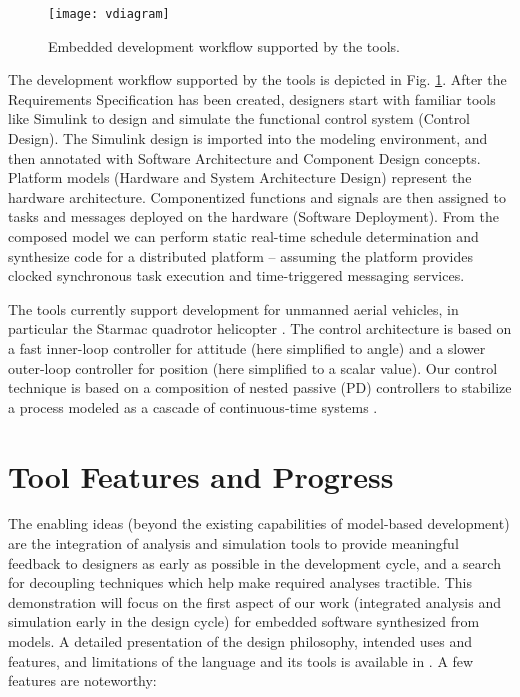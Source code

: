 \begin{figure}[!b]
\centering
\texttt{[image: vdiagram]}
\caption{Embedded development workflow supported by the tools.}
\label{fig:vdiagram}
\end{figure}

The development workflow supported by the tools is depicted in 
Fig. \ref{fig:vdiagram}.  After the Requirements Specification 
has been created, designers start with familiar tools like Simulink to
design and simulate the functional control system (Control Design).  
The Simulink design is imported into the modeling 
environment, and then annotated with Software Architecture and Component 
Design concepts.  Platform models (Hardware and System Architecture 
Design) represent the hardware architecture.  Componentized functions 
and signals are then assigned to tasks and messages deployed on the 
hardware (Software Deployment). From the composed model we can perform 
static real-time schedule determination and synthesize code for a distributed 
platform -- assuming the platform provides clocked synchronous task execution 
and time-triggered messaging services.  

The tools currently support development for unmanned aerial vehicles,
in particular the Starmac quadrotor helicopter \cite{HRWDJT04}.  The control
architecture is based on a fast inner-loop controller for attitude (here simplified
to angle) and a slower outer-loop controller for position (here simplified to a
scalar value).  Our control technique is based on a composition of nested passive 
(PD) controllers to stabilize a process modeled as a cascade of continuous-time 
systems \cite[Fig.~1]{kottenstette08:_digit_passiv_attit_and_altit}.  

\section{Tool Features and Progress}

The enabling ideas (beyond the existing capabilities of model-based 
development) are the integration of analysis and simulation tools to 
provide meaningful feedback to designers as early as possible in the 
development cycle, and a search for decoupling techniques which help 
make required analyses tractible.  This demonstration will focus on 
the first aspect of our work (integrated analysis and simulation early in the
design cycle) for embedded software synthesized from models.  A detailed presentation 
of the design philosophy, intended uses and features, and limitations 
of the language and its tools is available in \cite{aces08}.  A few 
features are noteworthy:


